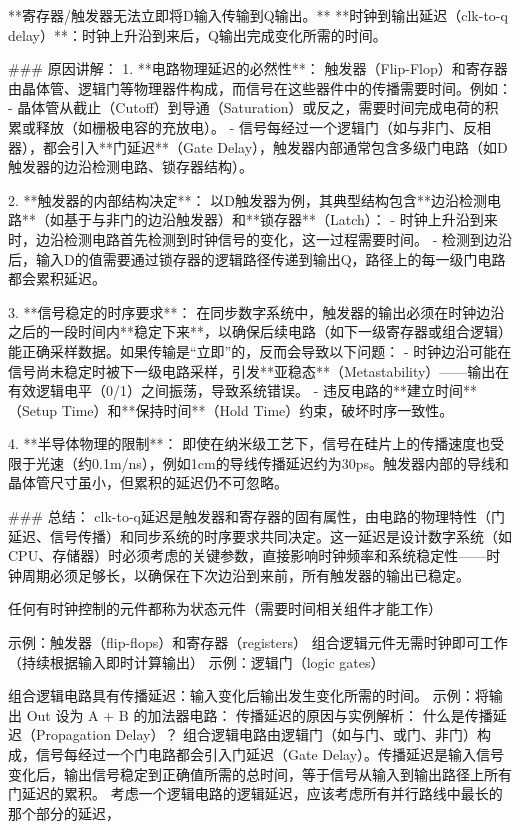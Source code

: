 \documentclass{ctexart}
\begin{document}
  
**寄存器/触发器无法立即将D输入传输到Q输出。**  
**时钟到输出延迟（clk-to-q delay）**：时钟上升沿到来后，Q输出完成变化所需的时间。  

### 原因讲解：  
1. **电路物理延迟的必然性**：  
   触发器（Flip-Flop）和寄存器由晶体管、逻辑门等物理器件构成，而信号在这些器件中的传播需要时间。例如：  
   - 晶体管从截止（Cutoff）到导通（Saturation）或反之，需要时间完成电荷的积累或释放（如栅极电容的充放电）。  
   - 信号每经过一个逻辑门（如与非门、反相器），都会引入**门延迟**（Gate Delay），触发器内部通常包含多级门电路（如D触发器的边沿检测电路、锁存器结构）。  

2. **触发器的内部结构决定**：  
   以D触发器为例，其典型结构包含**边沿检测电路**（如基于与非门的边沿触发器）和**锁存器**（Latch）：  
   - 时钟上升沿到来时，边沿检测电路首先检测到时钟信号的变化，这一过程需要时间。  
   - 检测到边沿后，输入D的值需要通过锁存器的逻辑路径传递到输出Q，路径上的每一级门电路都会累积延迟。  

3. **信号稳定的时序要求**：  
   在同步数字系统中，触发器的输出必须在时钟边沿之后的一段时间内**稳定下来**，以确保后续电路（如下一级寄存器或组合逻辑）能正确采样数据。如果传输是“立即”的，反而会导致以下问题：  
   - 时钟边沿可能在信号尚未稳定时被下一级电路采样，引发**亚稳态**（Metastability）——输出在有效逻辑电平（0/1）之间振荡，导致系统错误。  
   - 违反电路的**建立时间**（Setup Time）和**保持时间**（Hold Time）约束，破坏时序一致性。  

4. **半导体物理的限制**：  
   即使在纳米级工艺下，信号在硅片上的传播速度也受限于光速（约0.1m/ns），例如1cm的导线传播延迟约为30ps。触发器内部的导线和晶体管尺寸虽小，但累积的延迟仍不可忽略。  


### 总结：  
clk-to-q延迟是触发器和寄存器的固有属性，由电路的物理特性（门延迟、信号传播）和同步系统的时序要求共同决定。这一延迟是设计数字系统（如CPU、存储器）时必须考虑的关键参数，直接影响时钟频率和系统稳定性——时钟周期必须足够长，以确保在下次边沿到来前，所有触发器的输出已稳定。\par
任何有时钟控制的元件都称为状态元件（需要时间相关组件才能工作）\par
示例：触发器（flip-flops）和寄存器（registers）
组合逻辑元件无需时钟即可工作（持续根据输入即时计算输出）
示例：逻辑门（logic gates）\par
组合逻辑电路具有传播延迟：输入变化后输出发生变化所需的时间。
示例：将输出 Out 设为 A + B 的加法器电路：
传播延迟的原因与实例解析：
什么是传播延迟（Propagation Delay）？
组合逻辑电路由逻辑门（如与门、或门、非门）构成，信号每经过一个门电路都会引入门延迟（Gate Delay）。传播延迟是输入信号变化后，输出信号稳定到正确值所需的总时间，等于信号从输入到输出路径上所有门延迟的累积。
考虑一个逻辑电路的逻辑延迟，应该考虑所有并行路线中最长的那个部分的延迟，
\end{document}
